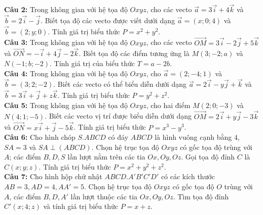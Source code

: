 \documentclass[12pt]{article}
\begin{document}
	
	\vspace{3mm}
	\noindent \textbf{Câu 2:} Trong không gian với hệ tọa độ $Oxyz$, cho các vecto $\vec{a} = 3\vec{i} + 4\vec{k}$ và $\vec{b} = 2\vec{i} - \vec{j}$. Biết tọa độ các vecto được viết dưới dạng $\vec{a} = (x; 0; 4)$ và $\vec{b} = (2; y; 0)$. Tính giá trị biểu thức $P = x^2 + y^2$. \\
	
	
	\vspace{3mm}
	\noindent \textbf{Câu 3:} Trong không gian với hệ tọa độ $Oxyz$, cho các vecto $\vec{OM} = 3\vec{i} - 2\vec{j} + 5\vec{k}$ và $\vec{ON} = -\vec{i} + 4\vec{j} - 2\vec{k}$. Biết tọa độ các điểm tương ứng là $M(3; -2; a)$ và $N(-1; b; -2)$. Tính giá trị của biểu thức $T = a - 2b$. \\
	
	
	\vspace{3mm}
	\noindent \textbf{Câu 4:} Trong không gian với hệ tọa độ $Oxyz$, cho $\vec{a} = (2; -4; 1)$ và $\vec{b} = (3; 2; -2)$. Biết các vecto có thể biểu diễn dưới dạng $\vec{a} = 2\vec{i} - y\vec{j} + \vec{k}$ và $\vec{b} = 3\vec{i} + \vec{j} + z\vec{k}$. Tính giá trị biểu thức $P = y^2 + z^2$. \\
	
	
	\vspace{3mm}
	\noindent \textbf{Câu 5:} Trong không gian với hệ tọa độ $Oxyz$, cho hai điểm $M(2; 0; -3)$ và $N(4; 1; -5)$. Biết các vecto vị trí được biểu diễn dưới dạng $\vec{OM} = 2\vec{i} + y\vec{j} - 3\vec{k}$ và $\vec{ON} = x\vec{i} + \vec{j} - 5\vec{k}$. Tính giá trị biểu thức $P = x^3 - y^3$. \\
	
	
	\vspace{3mm}
	\noindent \textbf{Câu 6:} Cho hình chóp $S.ABCD$ có đáy $ABCD$ là hình vuông cạnh bằng $4$, $SA = 3$ và $SA \perp (ABCD)$. Chọn hệ trục tọa độ $Oxyz$ có gốc tọa độ trùng với $A$; các điểm $B, D, S$ lần lượt nằm trên các tia $Ox, Oy, Oz$. Gọi tọa độ đỉnh $C$ là $C(x; y; z)$. Tính giá trị biểu thức $P = x^2 + y^2 + z^2$. \\
	
	
	\vspace{3mm}
	\noindent \textbf{Câu 7:} Cho hình hộp chữ nhật $ABCD.A'B'C'D'$ có các kích thước $AB = 3, AD = 4, AA' = 5$. Chọn hệ trục tọa độ $Oxyz$ có gốc tọa độ $O$ trùng với $A$, các điểm $B, D, A'$ lần lượt thuộc các tia $Ox, Oy, Oz$. Tìm tọa độ đỉnh $C'(x; 4; z)$ và tính giá trị biểu thức $P = x + z$. \\
	
\end{document}
